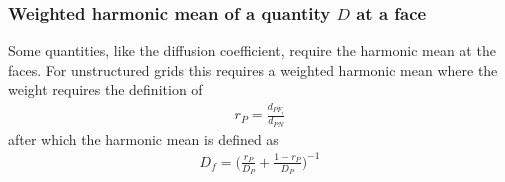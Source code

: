\documentclass[11pt,letterpaper,titlepage]{article}
\makeatletter
\newcommand{\beq}{\begin{equation*}
\begin{aligned}}
\newcommand{\eeq}{\end{aligned}
\end{equation*}}
\newcommand{\beqn}{\begin{equation}
	\begin{aligned}}
\newcommand{\eeqn}{\end{aligned}
	\end{equation}}
\newcommand{\bnabla}{\boldsymbol{\nabla}}
\newcommand*\bigcdot{\mathpalette\bigcdot@{.5}}
\newcommand*\bigcdot@[2]{\mathbin{\vcenter{\hbox{\scalebox{#2}{$\m@th#1\bullet$}}}}}
\numberwithin{equation}{section}
\makeatother
\begin{document}
%
%
%

\subsubsection{Weighted harmonic mean of a quantity $D$ at a face}
Some quantities, like the diffusion coefficient, require the harmonic mean at the faces. For unstructured grids this requires a weighted harmonic mean where the weight requires the definition of
\beqn 
r_P = \frac{d_{PF_i}}{d_{PN}}
\eeqn 
after which the harmonic mean is defined as
\beqn
D_f = \biggr( 
\frac{r_P}{D_P} + 
\frac{1-r_P}{D_P}
\biggr)^{-1}
\eeqn 
\end{document}
